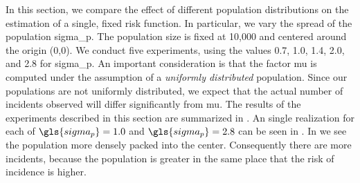 In this section, we compare the effect of different population distributions on the estimation of a single, fixed risk function.
In particular, we vary the \gls{spread} of the population \gls{sigma_p}.
The population size is fixed at 10,000 and centered around the origin (0,0).
We conduct five experiments, using the values 0.7, 1.0, 1.4, 2.0, and 2.8 for \gls{sigma_p}.
An important consideration is that the \gls{factor} \gls{mu} is computed under the assumption of a \textit{uniformly distributed} population.
Since our populations are not uniformly distributed, we expect that the actual number of incidents observed will differ significantly from \gls{mu}.
The results of the experiments described in this section are summarized in .
An single realization for each of $\gls{sigma_p} = 1.0$ and $\gls{sigma_p} = 2.8$ can be seen in .
In  we see the population more densely packed into the center.
Consequently there are more incidents,
because the population is greater in the same place that the risk of incidence is higher.

